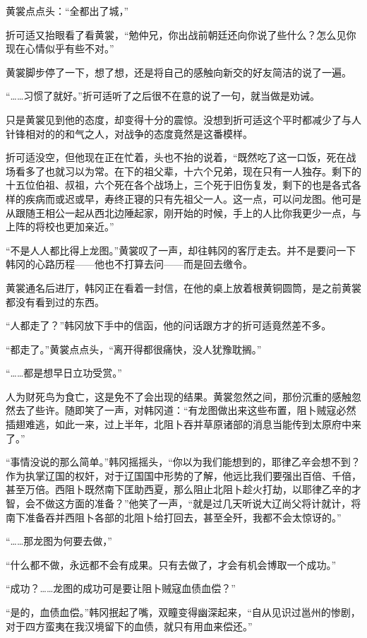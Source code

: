 黄裳点点头：“全都出了城，”

折可适又抬眼看了看黄裳，“勉仲兄，你出战前朝廷还向你说了些什么？怎么见你现在心情似乎有些不对。”

黄裳脚步停了一下，想了想，还是将自己的感触向新交的好友简洁的说了一遍。

“……习惯了就好。”折可适听了之后很不在意的说了一句，就当做是劝诫。

只是黄裳见到他的态度，却变得十分的震惊。没想到折可适这个平时都减少了与人针锋相对的的和气之人，对战争的态度竟然是这番模样。

折可适没空，但他现在正在忙着，头也不抬的说着，“既然吃了这一口饭，死在战场看多了也就习以为常。在下的祖父辈，十六个兄弟，现在只有一人独存。剩下的十五位伯祖、叔祖，六个死在各个战场上，三个死于旧伤复发，剩下的也是各式各样的疾病而或迟或早，寿终正寝的只有先祖父一人。这一点，可以问龙图。他可是从跟随王相公一起从西北边陲起家，刚开始的时候，手上的人比你我更少一点，与上阵的将校也更加亲近。”

“不是人人都比得上龙图。”黄裳叹了一声，却往韩冈的客厅走去。并不是要问一下韩冈的心路历程——他也不打算去问——而是回去缴令。

黄裳通名后进厅，韩冈正在看着一封信，在他的桌上放着根黄铜圆筒，是之前黄裳都没有看到过的东西。

“人都走了？”韩冈放下手中的信函，他的问话跟方才的折可适竟然差不多。

“都走了。”黄裳点点头，“离开得都很痛快，没人犹豫耽搁。”

“……都是想早日立功受赏。”

人为财死鸟为食亡，这是免不了会出现的结果。黄裳忽然之间，那份沉重的感触忽然去了些许。随即笑了一声，对韩冈道：“有龙图做出来这些布置，阻卜贼寇必然插翅难逃，如此一来，过上半年，北阻卜吞并草原诸部的消息当能传到太原府中来了。”

“事情没说的那么简单。”韩冈摇摇头，“你以为我们能想到的，耶律乙辛会想不到？作为执掌辽国的权奸，对于辽国国中形势的了解，他远比我们要强出百倍、千倍，甚至万倍。西阻卜既然南下匡助西夏，那么阻止北阻卜趁火打劫，以耶律乙辛的才智，会不做这方面的准备？”他笑了一声，“就是过几天听说大辽尚父将计就计，将南下准备吞并西阻卜各部的北阻卜给打回去，甚至全歼，我都不会太惊讶的。”

“……那龙图为何要去做，”

“什么都不做，永远都不会有成果。只有去做了，才会有机会博取一个成功。”

“成功？……龙图的成功可是要让阻卜贼寇血债血偿？”

“是的，血债血偿。”韩冈抿起了嘴，双瞳变得幽深起来，“自从见识过邕州的惨剧，对于四方蛮夷在我汉境留下的血债，就只有用血来偿还。”

